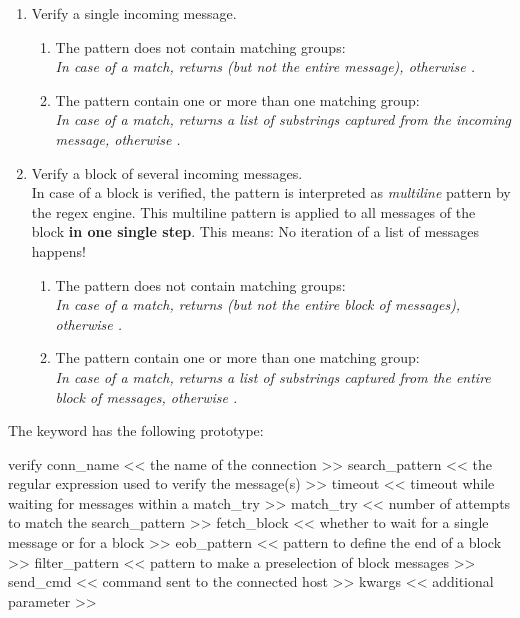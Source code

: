 \begin{enumerate}
    \item Verify a single incoming message.
    \begin{enumerate}
        \item The pattern does not contain matching groups:\\
        \textit{In case of a match,  returns  (but not the entire message), otherwise .}
        \item The pattern contain one or more than one matching group:\\
        \textit{In case of a match,  returns a list of substrings captured from the incoming message, otherwise .}
    \end{enumerate}
    \item Verify a block of several incoming messages.\\
        In case of a block is verified, the pattern is interpreted as \textit{multiline} pattern by the regex engine.
        This multiline pattern is applied to all messages of the block \textbf{in one single step}.
        This means: No iteration of a list of messages happens!
    \begin{enumerate}
        \item The pattern does not contain matching groups:\\
        \textit{In case of a match,  returns  (but not the entire block of messages), otherwise .}
        \item The pattern contain one or more than one matching group:\\
        \textit{In case of a match,  returns a list of substrings captured from the entire block of messages, otherwise .}
    \end{enumerate}
\end{enumerate}

\vspace{2ex}

The  keyword has the following prototype:

\begin{robotcode}
verify    conn_name      <\textless{} the name of the connection \textgreater{}>
          search_pattern <\textless{} the regular expression used to verify the message(s) \textgreater{}>
          timeout        <\textless{} timeout while waiting for messages within a match\_try \textgreater{}>
          match_try      <\textless{} number of attempts to match the search\_pattern \textgreater{}>
          fetch_block    <\textless{} whether to wait for a single message or for a block \textgreater{}>
          eob_pattern    <\textless{} pattern to define the end of a block \textgreater{}>
          filter_pattern <\textless{} pattern to make a preselection of block messages \textgreater{}>
          send_cmd       <\textless{} command sent to the connected host \textgreater{}>
          kwargs         <\textless{} additional parameter \textgreater{}>
\end{robotcode}

